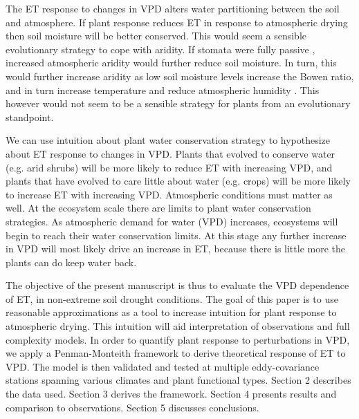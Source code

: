 \documentclass[draft,linenumbers]{agujournal}
\begin{document}
The ET response to changes in VPD alters water partitioning between the soil and atmosphere. If plant response reduces ET in response to atmospheric drying then soil moisture will be better conserved. This would seem a sensible evolutionary strategy to cope with aridity. If stomata were fully passive \citep [similar to soil pores, e.g. ][]{Or_2013}, increased atmospheric aridity would further reduce soil moisture. In turn, this would further increase aridity as low soil moisture levels increase the Bowen ratio, and in turn increase temperature and reduce atmospheric humidity \citep[gentine et al. GRL 2016][]{Berg_2016}.  This however would not seem to be a sensible strategy for plants from an evolutionary standpoint.

We can use intuition about plant water conservation strategy to hypothesize about ET response to changes in VPD. Plants that evolved to conserve water (e.g. arid shrubs) will be more likely to reduce ET with increasing VPD, and plants that have evolved to care little about water (e.g. crops) will be more likely to increase ET with increasing VPD. Atmospheric conditions must matter as well. At the ecosystem scale there are limits to plant water conservation strategies. As atmospheric demand for water (VPD) increases, ecosystems will begin to reach their water conservation limits. At this stage any further increase in VPD will most likely drive an increase in ET, because there is little more the plants can do keep water back. 

The objective of the present manuscript is thus to evaluate the VPD dependence of ET, in non-extreme soil drought conditions. The goal of this paper is to use reasonable approximations as a tool to increase intuition for plant response to atmospheric drying. This intuition will aid interpretation of observations and full complexity models. In order to quantify plant response to perturbations in VPD, we apply a Penman-Monteith framework to derive theoretical response of ET to VPD. The model is then validated and tested at multiple eddy-covariance stations spanning various climates and plant functional types. Section 2 describes the data used. Section 3 derives the framework. Section 4 presents results and comparison to observations. Section 5 discusses conclusions. 
\end{document}
